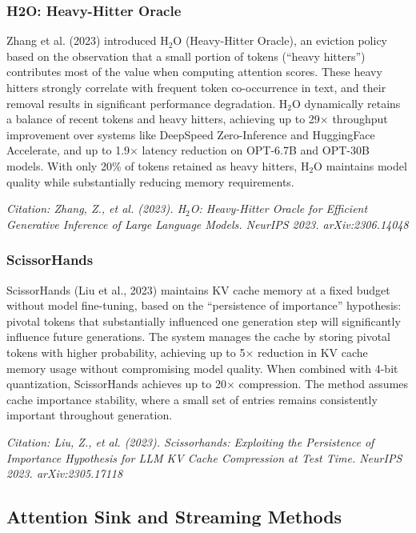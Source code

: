 \documentclass[11pt,letterpaper]{article}
\begin{document}
\subsubsection{H2O: Heavy-Hitter Oracle}

Zhang et al. (2023) introduced H$_2$O (Heavy-Hitter Oracle), an eviction policy based on the observation that a small portion of tokens (``heavy hitters'') contributes most of the value when computing attention scores. These heavy hitters strongly correlate with frequent token co-occurrence in text, and their removal results in significant performance degradation. H$_2$O dynamically retains a balance of recent tokens and heavy hitters, achieving up to 29$\times$ throughput improvement over systems like DeepSpeed Zero-Inference and HuggingFace Accelerate, and up to 1.9$\times$ latency reduction on OPT-6.7B and OPT-30B models. With only 20\% of tokens retained as heavy hitters, H$_2$O maintains model quality while substantially reducing memory requirements.

\textit{Citation: Zhang, Z., et al. (2023). H$_2$O: Heavy-Hitter Oracle for Efficient Generative Inference of Large Language Models. NeurIPS 2023. arXiv:2306.14048}

\subsubsection{ScissorHands}

ScissorHands (Liu et al., 2023) maintains KV cache memory at a fixed budget without model fine-tuning, based on the ``persistence of importance'' hypothesis: pivotal tokens that substantially influenced one generation step will significantly influence future generations. The system manages the cache by storing pivotal tokens with higher probability, achieving up to 5$\times$ reduction in KV cache memory usage without compromising model quality. When combined with 4-bit quantization, ScissorHands achieves up to 20$\times$ compression. The method assumes cache importance stability, where a small set of entries remains consistently important throughout generation.

\textit{Citation: Liu, Z., et al. (2023). Scissorhands: Exploiting the Persistence of Importance Hypothesis for LLM KV Cache Compression at Test Time. NeurIPS 2023. arXiv:2305.17118}

\subsection{Attention Sink and Streaming Methods}
\end{document}
